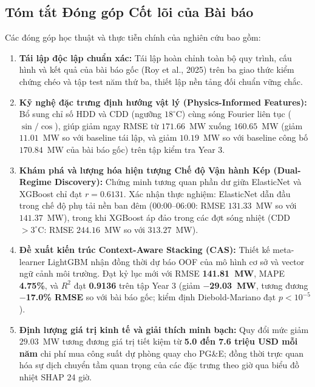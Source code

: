 \subsection{Tóm tắt Đóng góp Cốt lõi của Bài báo}
Các đóng góp học thuật và thực tiễn chính của nghiên cứu bao gồm:
\begin{enumerate}
    \item \textbf{Tái lập độc lập chuẩn xác:} Tái lập hoàn chỉnh toàn bộ quy trình, cấu hình và kết quả của bài báo gốc (Roy et al., 2025) trên ba giao thức kiểm chứng chéo và tập test năm thứ ba, thiết lập nền tảng đối chuẩn vững chắc.
    \item \textbf{Kỹ nghệ đặc trưng định hướng vật lý (Physics-Informed Features):} Bổ sung chỉ số HDD và CDD (ngưỡng $18^\circ\text{C}$) cùng sóng Fourier liên tục ($\sin/\cos$), giúp giảm ngay RMSE từ $171.66$~MW xuống $160.65$~MW (giảm $11.01$~MW so với baseline tái lập, và giảm $10.19$~MW so với baseline công bố $170.84$~MW của bài báo gốc) trên tập kiểm tra Year 3.
    \item \textbf{Khám phá và lượng hóa hiện tượng Chế độ Vận hành Kép (Dual-Regime Discovery):} Chứng minh tương quan phần dư giữa ElasticNet và XGBoost chỉ đạt $r = 0.6131$. Xác nhận thực nghiệm: ElasticNet dẫn đầu trong chế độ phụ tải nền ban đêm (00:00--06:00: RMSE $131.33$~MW so với $141.37$~MW), trong khi XGBoost áp đảo trong các đợt sóng nhiệt (CDD $> 3^\circ\text{C}$: RMSE $244.16$~MW so với $313.27$~MW).
    \item \textbf{Đề xuất kiến trúc Context-Aware Stacking (CAS):} Thiết kế meta-learner LightGBM nhận đồng thời dự báo OOF của mô hình cơ sở và vector ngữ cảnh môi trường. Đạt kỷ lục mới với RMSE \textbf{141.81~MW}, MAPE \textbf{4.75\%}, và $R^2$ đạt \textbf{0.9136} trên tập Year 3 (giảm \textbf{$-$29.03~MW}, tương đương \textbf{$-$17.0\% RMSE} so với bài báo gốc; kiểm định Diebold-Mariano đạt $p < 10^{-5}$).
    \item \textbf{Định lượng giá trị kinh tế và giải thích minh bạch:} Quy đổi mức giảm $29.03$~MW tương đương giá trị tiết kiệm từ \textbf{5.0 đến 7.6 triệu USD mỗi năm} chi phí mua công suất dự phòng quay cho PG\&E; đồng thời trực quan hóa sự dịch chuyển tầm quan trọng của các đặc trưng theo giờ qua biểu đồ nhiệt SHAP 24 giờ.
\end{enumerate}
